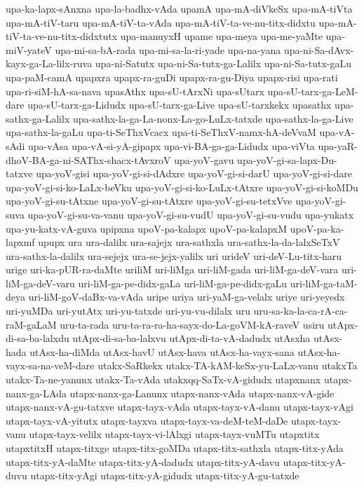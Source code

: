 {upa-ka-lapx-sAnxna
upa-la-badhx-vAda
upamA
upa-mA-diVkeSx
upa-mA-tiVta
upa-mA-tiV-taru
upa-mA-tiV-ta-vAda
upa-mA-tiV-ta-ve-nu-titx-didxtu
upa-mA-tiV-ta-ve-nu-titx-didxtutx
upa-manuyxH
upame
upa-meya
upa-me-yaMte
upa-miV-yateV
upa-mi-sa-bA-rada
upa-mi-sa-la-ri-yade
upa-na-yana
upa-ni-Sa-dAvx-kayx-ga-La-lilx-ruva
upa-ni-Satutx
upa-ni-Sa-tutx-ga-Lalilx
upa-ni-Sa-tutx-gaLu
upa-paM-camA
upapxra
upapx-ra-guDi
upapx-ra-gu-Diya
upapx-risi
upa-rati
upa-ri-siM-hA-sa-nava
upasAthx
upa-sU-tArxNi
upa-sUtarx
upa-sU-tarx-ga-LeM-dare
upa-sU-tarx-ga-Lidudx
upa-sU-tarx-ga-Live
upa-sU-tarxkekx
upasathx
upa-sathx-ga-Lalilx
upa-sathx-la-ga-La-nonx-La-go-LuLx-tatxde
upa-sathx-la-ga-Live
upa-sathx-la-gaLu
upa-ti-SeThxVcacx
upa-ti-SeThxV-namx-hA-deVvaM
upa-vA-sAdi
upa-vAsa
upa-vA-si-yA-gipapx
upa-vi-BA-ga-ga-Lidudx
upa-viVta
upa-yaR-dhoV-BA-ga-ni-SAThx-shacx-tAvxroV
upa-yoV-gavu
upa-yoV-gi-sa-lapx-Du-tatxve
upa-yoV-gisi
upa-yoV-gi-si-dAdxre
upa-yoV-gi-si-darU
upa-yoV-gi-si-dare
upa-yoV-gi-si-ko-LaLx-beVku
upa-yoV-gi-si-ko-LuLx-tAtxre
upa-yoV-gi-si-koMDu
upa-yoV-gi-su-tAtxne
upa-yoV-gi-su-tAtxre
upa-yoV-gi-su-tetxVve
upa-yoV-gi-suva
upa-yoV-gi-su-va-vanu
upa-yoV-gi-su-vudU
upa-yoV-gi-su-vudu
upa-yukatx
upa-yu-katx-vA-guva
upipxna
upoV-pa-kalapx
upoV-pa-kalapxM
upoV-pa-ka-lapxmf
upupx
ura
ura-dalilx
ura-sajejx
ura-sathxla
ura-sathx-la-da-lalxSeTxV
ura-sathx-la-dalilx
ura-sejejx
ura-se-jejx-yalilx
uri
urideV
uri-deV-Lu-titx-haru
urige
uri-ka-pUR-ra-daMte
uriliM
uri-liMga
uri-liM-gada
uri-liM-ga-deV-vara
uri-liM-ga-deV-varu
uri-liM-ga-pe-didx-gaLa
uri-liM-ga-pe-didx-gaLu
uri-liM-ga-taM-deya
uri-liM-goV-daBx-va-vAda
uripe
uriya
uri-yaM-ga-velalx
uriye
uri-yeyedx
uri-yuMDa
uri-yutAtx
uri-yu-tatxde
uri-yu-vu-dilalx
uru
uru-sa-ka-la-ca-rA-ca-raM-gaLaM
uru-ta-rada
uru-ta-ra-ra-ha-sayx-do-La-goVM-kA-raveV
usiru
utApx-di-sa-ba-lalxdu
utApx-di-sa-ba-lalxvu
utApx-di-ta-vA-dadudx
utAsxha
utAsx-hada
utAsx-ha-diMda
utAsx-havU
utAsx-hava
utAsx-ha-vayx-sana
utAsx-ha-vayx-sa-na-veM-dare
utakx-SaRkekx
utakx-TA-kAM-keSx-yu-LaLx-vanu
utakxTa
utakx-Ta-ne-yanunx
utakx-Ta-vAda
utakxqq-SaTx-vA-gidudx
utapxnanx
utapx-nanx-ga-LAda
utapx-nanx-ga-Lanunx
utapx-nanx-vAda
utapx-nanx-vA-gide
utapx-nanx-vA-gu-tatxve
utapx-tayx-vAda
utapx-tayx-vA-danu
utapx-tayx-vAgi
utapx-tayx-vA-yitutx
utapx-tayxva
utapx-tayx-va-deM-teM-daDe
utapx-tayx-vanu
utapx-tayx-velilx
utapx-tayx-vi-lAlxgi
utapx-tayx-vuMTu
utapxtitx
utapxtitxH
utapx-titxge
utapx-titx-goMDa
utapx-titx-sathxla
utapx-titx-yAda
utapx-titx-yA-daMte
utapx-titx-yA-dadudx
utapx-titx-yA-davu
utapx-titx-yA-duvu
utapx-titx-yAgi
utapx-titx-yA-gidudx
utapx-titx-yA-gu-tatxde
}
